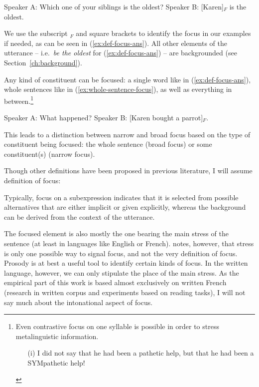 
\eal 
\ex Speaker A: Which one of your siblings is the oldest? \label{ex:def-focus-qu}
\ex Speaker B: [Karen]$_F$ is the oldest. \label{ex:def-focus-ans}
\zl 

We use the subscript $_F$ and square brackets to identify the focus in our examples if needed, as can be seen in (\ref{ex:def-focus-ans}). All other elements of the utterance -- i.e.\ \emph{be the oldest} for (\ref{ex:def-focus-ans}) -- are backgrounded (see Section~\ref{ch:background}).  

Any kind of constituent can be focused: a single word like in (\ref{ex:def-focus-ans}), whole sentences like in (\ref{ex:whole-sentence-focus}), as well as everything in between.\footnote{Even contrastive focus on one syllable is possible in order to stress metalinguistic information.
\begin{itemize}
    \item[(i)] I did not say that he had been a pathetic help, but that he had been a SYMpathetic help! 
\end{itemize}}  

\eal 
\ex Speaker A: What happened?
\ex Speaker B: [Karen bought a parrot]$_F$. \label{ex:whole-sentence-focus}
\zl 


This leads to a distinction between narrow and broad focus based on the type of constituent being focused: 
the whole sentence (broad focus) or some constituent(s) (narrow focus). 

Though other definitions have been proposed in previous literature, I will assume  definition of focus:

\ea Typically, focus on a subexpression indicates that it is selected from possible alternatives that are either implicit or given explicitly, whereas the background can be derived from the context of the utterance.\label{ex:definition-focus}
\z 

The focused element is also mostly the one bearing the main stress of the sentence (at least in languages like English or French).
\citet{Krifka.2007} notes, however, that stress is only one possible way to signal focus, and not the very definition of focus. Prosody is at best a useful tool to identify certain kinds of focus. In the written language, however, we can only stipulate the place of the main stress. As the empirical part of this work is based almost exclusively on written French (research in written corpus and experiments based on reading tasks), I will not say much about the intonational aspect of focus.

